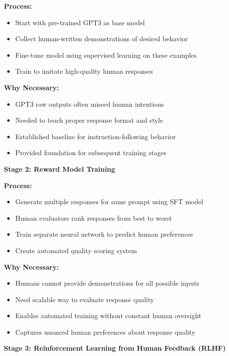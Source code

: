\documentclass[12pt]{article}
\begin{document}
\begin{enumerate}
\begin{enumerate}[(a)]
\begin{enumerate}[(a)]
{    \textbf{Process:}
    \begin{itemize}
        \item Start with pre-trained GPT3 as base model
        \item Collect human-written demonstrations of desired behavior
        \item Fine-tune model using supervised learning on these examples
        \item Train to imitate high-quality human responses
    \end{itemize}
    
    \textbf{Why Necessary:}
    \begin{itemize}
        \item GPT3 raw outputs often missed human intentions
        \item Needed to teach proper response format and style
        \item Established baseline for instruction-following behavior
        \item Provided foundation for subsequent training stages
    \end{itemize}
    
    \textbf{Stage 2: Reward Model Training}
    
    \textbf{Process:}
    \begin{itemize}
        \item Generate multiple responses for same prompt using SFT model
        \item Human evaluators rank responses from best to worst
        \item Train separate neural network to predict human preferences
        \item Create automated quality scoring system
    \end{itemize}
    
    \textbf{Why Necessary:}
    \begin{itemize}
        \item Humans cannot provide demonstrations for all possible inputs
        \item Need scalable way to evaluate response quality
        \item Enables automated training without constant human oversight
        \item Captures nuanced human preferences about response quality
    \end{itemize}
    
    \textbf{Stage 3: Reinforcement Learning from Human Feedback (RLHF)}
    
}
\end{enumerate}
\end{enumerate}
\end{enumerate}
\end{document}
